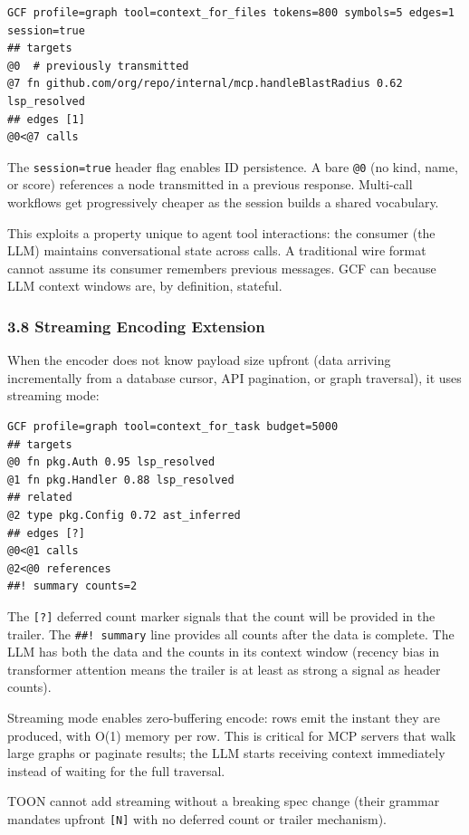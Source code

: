 \documentclass[
  11pt,
  paper=a4,
  ,captions=tableheading
]{scrartcl}
\begin{document}
\begin{verbatim}
GCF profile=graph tool=context_for_files tokens=800 symbols=5 edges=1 session=true
## targets
@0  # previously transmitted
@7 fn github.com/org/repo/internal/mcp.handleBlastRadius 0.62 lsp_resolved
## edges [1]
@0<@7 calls
\end{verbatim}

The \texttt{session=true} header flag enables ID persistence. A bare
\texttt{@0} (no kind, name, or score) references a node transmitted in a
previous response. Multi-call workflows get progressively cheaper as the
session builds a shared vocabulary.

This exploits a property unique to agent tool interactions: the consumer
(the LLM) maintains conversational state across calls. A traditional
wire format cannot assume its consumer remembers previous messages. GCF
can because LLM context windows are, by definition, stateful.

\subsubsection{3.8 Streaming Encoding
Extension}\label{streaming-encoding-extension}

When the encoder does not know payload size upfront (data arriving
incrementally from a database cursor, API pagination, or graph
traversal), it uses streaming mode:

\begin{verbatim}
GCF profile=graph tool=context_for_task budget=5000
## targets
@0 fn pkg.Auth 0.95 lsp_resolved
@1 fn pkg.Handler 0.88 lsp_resolved
## related
@2 type pkg.Config 0.72 ast_inferred
## edges [?]
@0<@1 calls
@2<@0 references
##! summary counts=2
\end{verbatim}

The \texttt{{[}?{]}} deferred count marker signals that the count will
be provided in the trailer. The \texttt{\#\#!\ summary} line provides
all counts after the data is complete. The LLM has both the data and the
counts in its context window (recency bias in transformer attention
means the trailer is at least as strong a signal as header counts).

Streaming mode enables zero-buffering encode: rows emit the instant they
are produced, with O(1) memory per row. This is critical for MCP servers
that walk large graphs or paginate results; the LLM starts receiving
context immediately instead of waiting for the full traversal.

TOON cannot add streaming without a breaking spec change (their grammar
mandates upfront \texttt{{[}N{]}} with no deferred count or trailer
mechanism).
\end{document}
